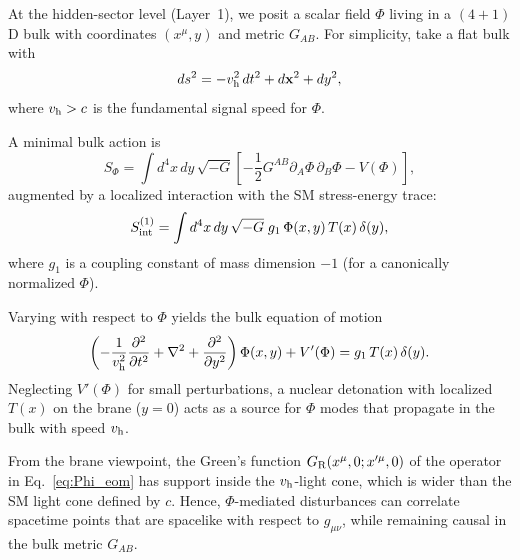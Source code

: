 \documentclass[aps,prd,twocolumn,nofootinbib,superscriptaddress]{revtex4-2}
\begin{document}
At the hidden-sector level (Layer~1), we posit a scalar field $\Phi$ living in a $(4+1)$D bulk with coordinates $(x^\mu, y)$ and metric $G_{AB}$. For simplicity, take a flat bulk with
\begin{equation}
    ds^2 = -v_{\rm h}^2 \, dt^2 + d\mathbf{x}^2 + dy^2,
    \label{eq:bulk_metric}
\end{equation}
where $v_{\rm h} > c$ is the fundamental signal speed for $\Phi$.

A minimal bulk action is
\begin{equation}
    S_\Phi = \int d^4x \, dy \, \sqrt{-G}
    \left[
        -\frac{1}{2} G^{AB} \partial_A \Phi \, \partial_B \Phi - V(\Phi)
    \right],
\end{equation}
augmented by a localized interaction with the SM stress-energy trace:
\begin{equation}
    S_{\rm int}^{(1)} = \int d^4x \, dy \, \sqrt{-G} \;
    g_1 \, \Phi(x,y) \, T(x) \, \delta(y),
    \label{eq:layer1_int}
\end{equation}
where $g_1$ is a coupling constant of mass dimension $-1$ (for a canonically normalized $\Phi$).

Varying with respect to $\Phi$ yields the bulk equation of motion
\begin{equation}
    \left(
        -\frac{1}{v_{\rm h}^2} \frac{\partial^2}{\partial t^2}
        + \nabla^2
        + \frac{\partial^2}{\partial y^2}
    \right) \Phi(x,y) + V'(\Phi)
    = g_1 \, T(x) \, \delta(y).
    \label{eq:Phi_eom}
\end{equation}
Neglecting $V'(\Phi)$ for small perturbations, a nuclear detonation with localized $T(x)$ on the brane ($y = 0$) acts as a source for $\Phi$ modes that propagate in the bulk with speed $v_{\rm h}$.

From the brane viewpoint, the Green's function $G_{\rm R}(x^\mu, 0; x'^\mu, 0)$ of the operator in Eq.~\eqref{eq:Phi_eom} has support inside the $v_{\rm h}$-light cone, which is wider than the SM light cone defined by $c$. Hence, $\Phi$-mediated disturbances can correlate spacetime points that are spacelike with respect to $g_{\mu\nu}$, while remaining causal in the bulk metric $G_{AB}$.
\end{document}
